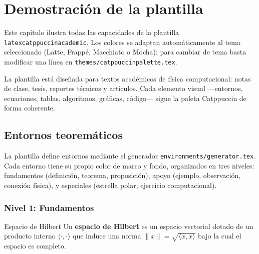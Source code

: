 \chapter{Demostración de la plantilla}
\label{ch:demo}

Este capítulo ilustra todas las capacidades de la plantilla
\texttt{latex\-catppuccin\-academic}. Los colores se adaptan automáticamente
al tema seleccionado (Latte, Frappé, Macchiato o Mocha); para cambiar de
tema basta modificar una línea en
\texttt{themes/\allowbreak catppuccin\-palette.tex}.

La plantilla está diseñada para textos académicos de física computacional:
notas de clase, tesis, reportes técnicos y artículos. Cada elemento visual
---entornos, ecuaciones, tablas, algoritmos, gráficas, código--- sigue la
paleta Catppuccin de forma coherente.


\section{Entornos teoremáticos}
\label{sec:entornos}

La plantilla define entornos mediante el generador
\texttt{environments/\allowbreak generator.tex}.
Cada entorno tiene su propio color de marco y fondo, organizados en tres niveles:
fundamentos (definición, teorema, proposición), apoyo (ejemplo, observación,
conexión física), y especiales (estrella polar, ejercicio computacional).

\subsection{Nivel 1: Fundamentos}

\begin{definicion}{Espacio de Hilbert}
Un \textbf{espacio de Hilbert} es un espacio vectorial dotado de un producto
interno $\langle \cdot, \cdot \rangle$ que induce una norma
$\|x\| = \sqrt{\langle x, x \rangle}$ bajo la cual el espacio es completo.
\end{definicion}


